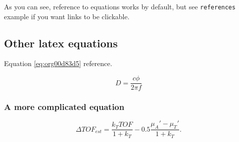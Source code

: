 As you can see, reference to equations works by default, but see \texttt{references}
example if you want links to be clickable.

\subsection{Other latex equations}
\label{sec:orgbda25a8}
Equation \ref{eq:org00d83d5} reference.

\begin{equation}
\label{eq:org00d83d5}
D = \frac{c\phi}{2\pi f}
\end{equation}

\subsubsection{A more complicated equation}
\label{sec:org23e130c}

\begin{equation}
\Delta TOF_{est} = \frac{k_T TOF}{1+k_T } - 0.5 \frac{\mu_A' - \mu_T'}{1+k_T}.
\end{equation}


